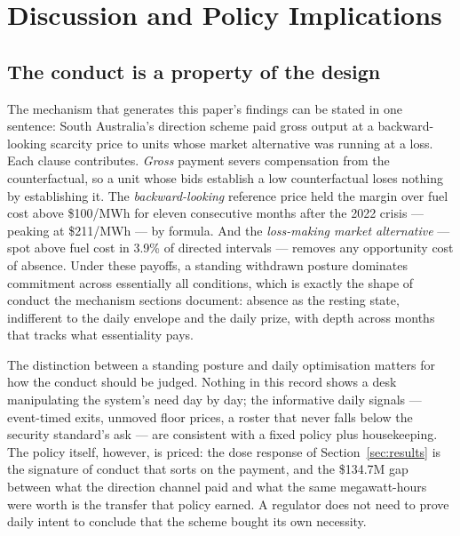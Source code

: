 \section{Discussion and Policy Implications}\label{sec:discussion}

\subsection{The conduct is a property of the design}

The mechanism that generates this paper's findings can be stated in one
sentence: South Australia's direction scheme paid gross output at a
backward-looking scarcity price to units whose market alternative was running
at a loss. Each clause contributes. \emph{Gross} payment severs compensation
from the counterfactual, so a unit whose bids establish a low counterfactual
loses nothing by establishing it. The \emph{backward-looking} reference price
held the margin over fuel cost above \$100/MWh for eleven consecutive months
after the 2022 crisis --- peaking at \$211/MWh --- by formula. And the \emph{loss-making market alternative} --- spot
above fuel cost in 3.9\% of directed intervals --- removes any opportunity
cost of absence. Under these payoffs, a standing withdrawn posture dominates
commitment across essentially all conditions, which is exactly the shape of
conduct the mechanism sections document: absence as the resting state,
indifferent to the daily envelope and the daily prize, with depth across
months that tracks what essentiality pays.

The distinction between a standing posture and daily optimisation matters for
how the conduct should be judged. Nothing in this record shows a desk
manipulating the system's need day by day; the informative daily signals ---
event-timed exits, unmoved floor prices, a roster that never falls below the
security standard's ask --- are consistent with a fixed policy plus
housekeeping. The policy itself, however, is priced: the dose response of
Section~\ref{sec:results} is the signature of conduct that sorts on the
payment, and the \$134.7M gap between what the direction channel paid and
what the same megawatt-hours were worth is the transfer that policy earned.
A regulator does not need to prove daily intent to conclude that the scheme
bought its own necessity.

